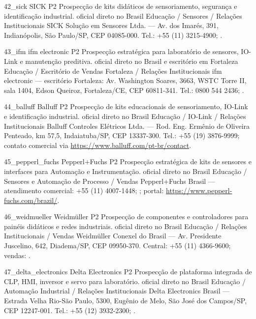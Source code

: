 \ContatoEmpresa
  {42_sick}
  {SICK}
  {P2}
  {Prospecção de kits didáticos de sensoriamento, segurança e identificação industrial.}
  {oficial direto no Brasil}
  {Educação / Sensores / Relações Institucionais}
  {SICK Solução em Sensores Ltda. — Av. dos Imarés, 391, Indianópolis, São Paulo/SP, CEP 04085-000. Tel.: +55 (11) 3215-4900; .}

\ContatoEmpresa
  {43_ifm}
  {ifm electronic}
  {P2}
  {Prospecção estratégica para laboratório de sensores, IO-Link e manutenção preditiva.}
  {oficial direto no Brasil e escritório em Fortaleza}
  {Educação / Escritório de Vendas Fortaleza / Relações Institucionais}
  {ifm electronic — escritório Fortaleza: Av. Washington Soares, 3663, WSTC Torre II, sala 1404, Edson Queiroz, Fortaleza/CE, CEP 60811-341. Tel.: 0800 544 2436; .}

\ContatoEmpresa
  {44_balluff}
  {Balluff}
  {P2}
  {Prospecção de kits educacionais de sensoriamento, IO-Link e identificação industrial.}
  {oficial direto no Brasil}
  {Educação / IO-Link / Relações Institucionais}
  {Balluff Controles Elétricos Ltda. — Rod. Eng. Ermênio de Oliveira Penteado, km 57,5, Indaiatuba/SP, CEP 13337-300. Tel.: +55 (19) 3876-9999; contato comercial via \url{https://www.balluff.com/pt-br/contact}.}

\ContatoEmpresa
  {45_pepperl_fuchs}
  {Pepperl+Fuchs}
  {P2}
  {Prospecção estratégica de kits de sensores e interfaces para Automação e Instrumentação.}
  {oficial direto no Brasil}
  {Educação / Sensores e Automação de Processo / Vendas}
  {Pepperl+Fuchs Brasil — atendimento comercial: +55 (11) 4007-1448; ; portal: \url{https://www.pepperl-fuchs.com/brazil/}.}

\ContatoEmpresa
  {46_weidmueller}
  {Weidmüller}
  {P2}
  {Prospecção de componentes e controladores para painéis didáticos e redes industriais.}
  {oficial direto no Brasil}
  {Educação / Relações Institucionais / Vendas}
  {Weidmüller Conexel do Brasil — Av. Presidente Juscelino, 642, Diadema/SP, CEP 09950-370. Central: +55 (11) 4366-9600; vendas: .}

\ContatoEmpresa
  {47_delta_electronics}
  {Delta Electronics}
  {P2}
  {Prospecção de plataforma integrada de CLP, HMI, inversor e servo para laboratório.}
  {oficial direto no Brasil}
  {Educação / Automação Industrial / Relações Institucionais}
  {Delta Electronics Brasil — Estrada Velha Rio-São Paulo, 5300, Eugênio de Melo, São José dos Campos/SP, CEP 12247-001. Tel.: +55 (12) 3932-2300; .}

